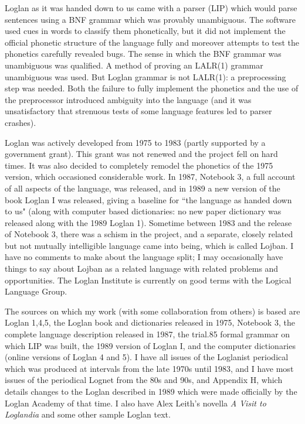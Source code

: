 \documentclass[12pt]{article}
\begin{document}
Loglan as it was handed down to us came with a parser (LIP) which would parse sentences using a BNF grammar which was provably unambiguous.  The software used cues in words to classify them phonetically, but it did not implement the official phonetic structure of the language fully and moreover attempts to test the phonetics carefully revealed bugs.  The sense in which the BNF grammar was unambiguous was qualified.  A method of proving an LALR(1) grammar unambiguous was used.
But Loglan grammar is not LALR(1):  a preprocessing step was needed.  Both the failure to fully implement the phonetics and the use of the preprocessor introduced ambiguity into the language (and it was unsatisfactory that strenuous tests of some language features led to parser crashes).

Loglan was actively developed from 1975 to 1983 (partly supported by a government grant).  This grant was not renewed and the project fell on hard times.  It was also decided to completely remodel the phonetics of the 1975 version, which occasioned considerable work.   In 1987, Notebook 3, a full account of all aspects of the language, was released, and in 1989 a new version of the book Loglan I was released, giving a baseline for ``the language as handed down to us" (along with computer based dictionaries:  no new paper dictionary was released along with the 1989 Loglan 1).  Sometime between 1983 and the release of Notebook 3, there was a schism in the project, and a separate, closely related but not mutually intelligible language came into being, which is called Lojban.  I have no comments to make about the language split;  I may occasionally have things to say about Lojban as a related language with related problems and opportunities.  The Loglan Institute is currently on good terms with the Logical Language Group.

The sources on which my work (with some collaboration from others) is based are Loglan 1,4,5, the Loglan book and dictionaries released in 1975, Notebook 3, the complete language description released in 1987, the trial.85 formal grammar on which LIP was built, the 1989 version of Loglan I, and the computer dictionaries (online versions of Loglan 4 and 5).  I have all issues of the Loglanist periodical which was produced at intervals from the late 1970s until 1983, and I have most issues of the periodical Lognet from the 80s and 90s, and Appendix H, which details changes to the Loglan described in 1989 which were made officially by the Loglan Academy of that time.  I also have Alex Leith's novella  {\em A Visit to Loglandia\/} and some other sample Loglan text.
\end{document}

